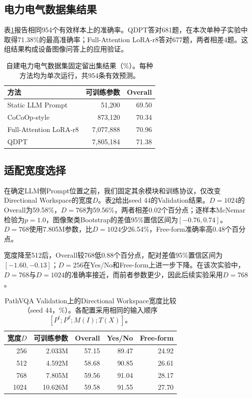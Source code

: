 \documentclass[pdflatex,sn-mathphys-num]{sn-jnl}
\begin{document}
\subsection{电力电气数据集结果}

表\ref{tab:electrical-results}报告相同954个有效样本上的准确率。QDPT答对681题，在本次单种子实验中取得71.38\%的最高准确率；Full-Attention LoRA-r8答对677题，两者相差4题。这组结果构成设备图像问答上的应用验证。

\begin{table}[t]
    \centering
    \caption{自建电力电气数据集固定留出集结果（\%）。每种方法均为单次运行，共954条有效预测。}
    \label{tab:electrical-results}
    \small
    \begin{tabular}{@{}lrr@{}}
        \toprule
        方法 & 可训练参数 & Overall \\
        \midrule
        Static LLM Prompt & 51,200 & 69.50 \\
        CoCoOp-style & 873,120 & 70.34 \\
        Full-Attention LoRA-r8 & 7,077,888 & 70.96 \\
        QDPT & 7,805,184 & 71.38 \\
        \bottomrule
    \end{tabular}
\end{table}

\subsection{适配宽度选择}

在确定LLM侧Prompt位置之前，我们固定其余模块和训练协议，仅改变Directional Workspace的宽度$D$。表\ref{tab:workspace-width}给出seed 44的Validation结果。$D=1024$的Overall为59.58\%，$D=768$为59.56\%，两者相差0.02个百分点；逐样本McNemar检验为$p=1.0$，图像聚类Bootstrap的差值95\%置信区间为$[-0.76,0.74]$。$D=768$使用7.805M参数，比$D=1024$少26.54\%，Free-form准确率高0.48个百分点。

宽度降至512后，Overall较768低0.88个百分点，配对差值95\%置信区间为$[-1.60,-0.13]$；$D=256$在Yes/No和Free-form上进一步下降。在该次实验中，$D=768$与$D=1024$的准确率接近，而前者参数更少，因此后续实验采用$D=768$。

\begin{table}[htbp]
    \centering
    \caption{PathVQA Validation上的Directional Workspace宽度比较（seed 44，\%）。各配置采用相同的输入顺序$[P^{t};P^{d};M(I);T(X)]$。}
    \label{tab:workspace-width}
    \small
    \begin{tabular}{@{}rrrrr@{}}
        \toprule
        宽度$D$ & 可训练参数 & Overall & Yes/No & Free-form \\
        \midrule
        256  & 2.033M  & 57.15 & 89.47 & 24.92 \\
        512  & 4.592M  & 58.68 & 90.85 & 26.61 \\
        768  & 7.805M  & 59.56 & 91.04 & 28.17 \\
        1024 & 10.626M & 59.58 & 91.55 & 27.70 \\
        \bottomrule
    \end{tabular}
\end{table}
\end{document}
